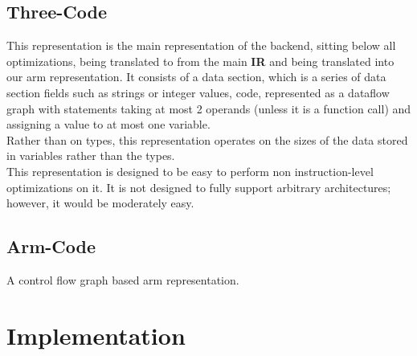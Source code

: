 \documentclass{article}
\newcommand{\keyword}[1]{\textbf{#1}}
\begin{document}
        \subsection*{Three-Code}
            This representation is the main representation of the backend, sitting below all optimizations, being translated to from the main \keyword{IR} and being translated into our arm representation. It consists of a data section, which is a series of data section fields such as strings or integer values, code, represented as a dataflow graph with statements taking at most 2 operands (unless it is a function call) and assigning a value to at most one variable. 
            \\ Rather than on types, this representation operates on the sizes of the data stored in variables rather than the types.
            \\ This representation is designed to be easy to perform non instruction-level optimizations on it. It is not designed to fully support arbitrary architectures; however, it would be moderately easy.
        
        \subsection*{Arm-Code}
            A control flow graph based arm representation. 
            

    \section*{Implementation}
\end{document}
